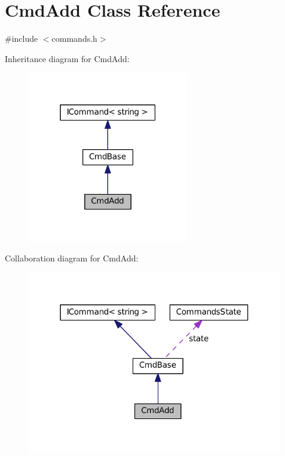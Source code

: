 \hypertarget{class_cmd_add}{}\section{Cmd\+Add Class Reference}
\label{class_cmd_add}


{\ttfamily \#include $<$commands.\+h$>$}



Inheritance diagram for Cmd\+Add\+:
\nopagebreak
\begin{figure}[H]
\begin{center}
\leavevmode
\includegraphics[width=199pt]{class_cmd_add__inherit__graph}
\end{center}
\end{figure}


Collaboration diagram for Cmd\+Add\+:
\nopagebreak
\begin{figure}[H]
\begin{center}
\leavevmode
\includegraphics[width=316pt]{class_cmd_add__coll__graph}
\end{center}
\end{figure}
